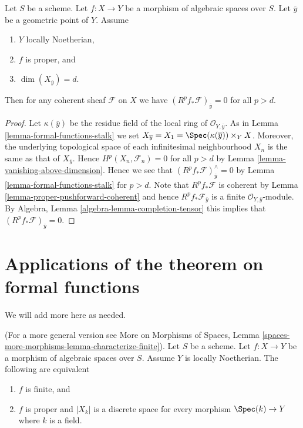 \begin{lemma}
\label{lemma-higher-direct-images-zero-above-dimension-fibre}
Let $S$ be a scheme.
Let $f : X \to Y$ be a morphism of algebraic spaces over $S$.
Let $\overline{y}$ be a geometric point of $Y$.
Assume
\begin{enumerate}
\item $Y$ locally Noetherian,
\item $f$ is proper, and
\item $\dim(X_{\overline{y}}) = d$.
\end{enumerate}
Then for any coherent sheaf $\mathcal{F}$ on $X$ we have
$(R^pf_*\mathcal{F})_{\overline{y}} = 0$ for all $p > d$.
\end{lemma}

\begin{proof}
Let $\kappa(\overline{y})$ be the residue field of the local
ring of $\mathcal{O}_{Y, \overline{y}}$. As in
Lemma \ref{lemma-formal-functions-stalk}
we set $X_{\overline{y}} = X_1 = \Spec(\kappa(\overline{y})) \times_Y X$.
Moreover, the underlying topological space of each infinitesimal
neighbourhood $X_n$ is the same as that of $X_{\overline{y}}$.
Hence $H^p(X_n, \mathcal{F}_n) = 0$ for all $p > d$ by
Lemma \ref{lemma-vanishing-above-dimension}.
Hence we see that $(R^pf_*\mathcal{F})_{\overline{y}}^\wedge = 0$
by Lemma \ref{lemma-formal-functions-stalk} for $p > d$.
Note that $R^pf_*\mathcal{F}$ is coherent by
Lemma \ref{lemma-proper-pushforward-coherent} and
hence $R^pf_*\mathcal{F}_{\overline{y}}$ is a finite
$\mathcal{O}_{Y, \overline{y}}$-module.
By Algebra, Lemma \ref{algebra-lemma-completion-tensor}
this implies that $(R^pf_*\mathcal{F})_{\overline{y}} = 0$.
\end{proof}






\section{Applications of the theorem on formal functions}
\label{section-applications-formal-functions}

\noindent
We will add more here as needed.

\begin{lemma}
\label{lemma-characterize-finite}
(For a more general version see
More on Morphisms of Spaces, Lemma
\ref{spaces-more-morphisms-lemma-characterize-finite}).
Let $S$ be a scheme.
Let $f : X \to Y$ be a morphism of algebraic spaces over $S$.
Assume $Y$ is locally Noetherian.
The following are equivalent
\begin{enumerate}
\item $f$ is finite, and
\item $f$ is proper and $|X_k|$ is a discrete space
for every morphism $\Spec(k) \to Y$ where $k$ is a field.
\end{enumerate}
\end{lemma}

